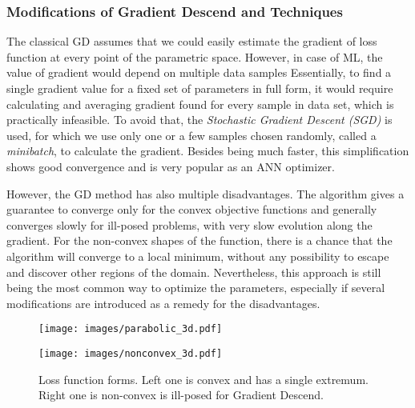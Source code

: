 \subsubsection{Modifications of Gradient Descend and Techniques}

The classical GD assumes that we could easily estimate the gradient of loss function at every point of the parametric space.
However, in case of ML, the value of gradient would depend on multiple data samples
Essentially, to find a single gradient value for a fixed set of parameters in full form, it would require calculating and averaging gradient found for every sample in data set, which is practically infeasible.
To avoid that, the \emph{Stochastic Gradient Descent (SGD)} is used, for which we use only one or a few samples chosen randomly, called a \emph{minibatch}, to calculate the gradient.
Besides being much faster, this simplification shows good convergence and is very popular as an ANN optimizer\cite{}.
\medskip

However, the GD method has also multiple disadvantages.
The algorithm gives a guarantee to converge only for the convex objective functions and generally converges slowly for ill-posed problems, with very slow evolution along the gradient.
For the non-convex shapes of the function, there is a chance that the algorithm will converge to a local minimum, without any possibility to escape and discover other regions of the domain\cite{}.
Nevertheless, this approach is still being the most common way to optimize the parameters, especially if several modifications are introduced as a remedy for the disadvantages.
\begin{figure}[h]
	\begin{multicols}{2}
		\texttt{[image: images/parabolic\_3d.pdf]}\par
		\texttt{[image: images/nonconvex\_3d.pdf]}\par
	\end{multicols}
	\caption{Loss function forms. Left one is convex and has a single extremum. Right one is non-convex is ill-posed for Gradient Descend. }
	\label{fig:lossfunc_demo}
\end{figure}
\medskip


